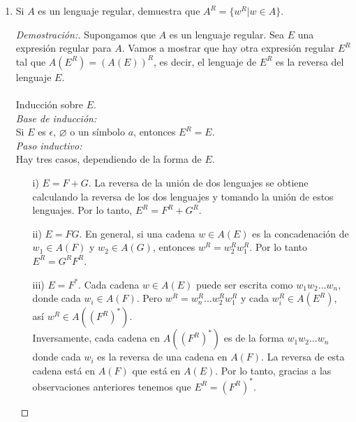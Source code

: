 \documentclass[letterpaper,11pt]{article}
\begin{document}
\begin{enumerate}
\item Si $A$ es un lenguaje regular, demuestra que $A^{R} = \{w^{R} | w \in A\}$.
  \begin{proof}[Demostración:]
    Supongamos que $A$ es un lenguaje regular. Sea $E$ una expresión 
    regular para $A$. Vamos a mostrar que hay otra expresión regular $E^{R}$
    tal que $A(E^{R}) = (A(E))^{R}$, es decir, el lenguaje de $E^{R}$ es la
    reversa del lenguaje $E$.\\ \\
    Inducción sobre $E$.\\
    \textit{Base de inducción:} \\ 
    Si $E$ es $\epsilon$, $\varnothing$ o un símbolo $a$, entonces 
    $E^{R} = E$.\\
    \textit{Paso inductivo: } \\ 
    Hay tres casos, dependiendo de la forma de $E$.
    \begin{itemize}
     \item[i)] $E = F + G$. La reversa de la unión de dos lenguajes se obtiene
     calculando la reversa de los dos lenguajes y tomando la unión de estos
     lenguajes. Por lo tanto, $E^{R} = F^{R} + G^{R}$.
     \item[ii)] $E = FG$.  En general, si una cadena $w \in A(E)$ es la 
     concadenación de $w_1 \in A(F)$ y $w_2 \in A(G)$, entonces 
     $w^{R} = w_2^{R} w_1^{R}$. Por lo tanto $E^{R} = G^{R} F^{R}$.
     \item[iii)] $E = F^{*}$. Cada cadena $w \in A(E)$ puede ser escrita como
     $w_1 w_2 ... w_n$, donde cada $w_i \in A(F)$. Pero 
     $w^{R} = w_n^{R} ... w_2^{R} w_1^{R}$ y cada $w_i^{R} \in A(E^{R})$,
     así $w^{R} \in A((F^{R})^{*})$.\\
     Inversamente, cada cadena en $A((F^{R})^{*})$ es de la forma 
     $w_1 w_2 ... w_n$ donde cada $w_i$ es la reversa de una cadena en 
     $A(F)$. La reversa de esta cadena está en $A(F)$ que está en $A(E)$.
     Por lo tanto, gracias a las observaciones anteriores tenemos que
     $E^{R} = (F^{R})^{*}$.
    \end{itemize}
    \end{proof}
  

\end{enumerate}
\end{document}
